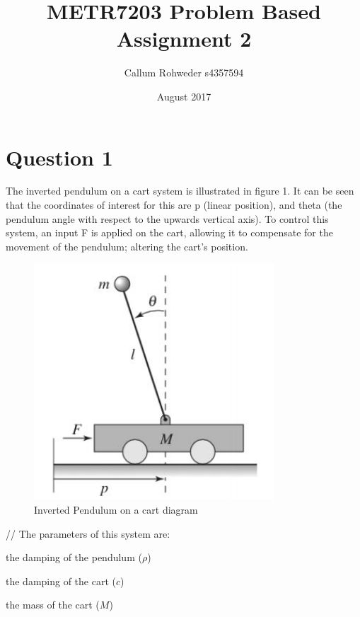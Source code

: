 \documentclass[12pt]{article}
\begin{document}
\title{METR7203 Problem Based Assignment 2}
\author{Callum Rohweder s4357594}
\date{August 2017}

\maketitle

\section{Question 1}
The inverted pendulum on a cart system is illustrated in figure 1. It can be seen that the coordinates of interest for this are p (linear position), and theta (the pendulum angle with respect to the upwards vertical axis). To control this system, an input F is applied on the cart, allowing it to compensate for the movement of the pendulum; altering the cart's position. 


\begin{center}
\begin{figure}[htb]
	\includegraphics[width=0.8\textwidth]{mass_and_cart.jpg}
\caption{Inverted Pendulum on a cart diagram}
\end{figure}
\end{center}



//
The parameters of this system are:

\rightarrow the damping of the pendulum ($\rho$)

\rightarrow the damping of the cart ($c$)

\rightarrow the mass of the cart ($M$)
\end{document}
